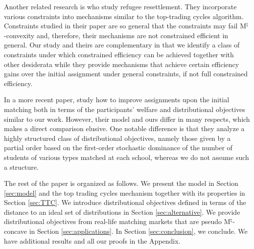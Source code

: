 \documentclass[12pt]{amsart}
\theoremstyle{remark}
\begin{document}
Another related research is \citet{delacretaz2019matching} who study refugee resettlement. They incorporate various constraints into mechanisms similar to the
top-trading cycles algorithm. Constraints studied in their paper are so general that the constraints may fail M$^\natural$-convexity and, therefore, their
mechanisms are not constrained efficient in general. Our study and theirs are complementary in that we identify a class of constraints under
which constrained efficiency can be achieved together with other desiderata while they provide mechanisms that achieve certain efficiency gains over
the initial assignment under general constraints, if not full constrained efficiency.

In a more recent paper, \cite{combe2022market} study how to improve assignments upon the initial matching both in terms of the participants' welfare and distributional objectives similar to our work. However, their model and ours differ in many respects, which makes a direct comparison elusive. One notable difference is that they analyze a highly structured class of distributional objectives, namely those given by a partial order based on the first-order stochastic dominance of the number of students of various types matched at each school, whereas we do not assume such a structure.

\begin{comment}
There are two recent papers with distributional objectives that do not impose individual rationality. First, \cite{imamuraefficient} study Pareto efficient matchings where distributional constraints are represented via a collection of sets that include student-school pairs. When the collection forms a \emph{matroid}, they show that the serial dictatorship algorithm can be used to check Pareto efficiency. Moreover, \cite{imamuraefficient} introduces a constrained version of the serial dictatorship algorithm to check for Pareto efficiency under general constraints. In contrast to our paper, this paper does not deal with incentive concerns. Second, \cite{koji2022} studies an object allocation problem with heterogeneous objects where agent preferences can have indifferences. He assumes that the set of feasible allocations forms a discrete structure called \emph{integral polymatroid} and constructs a mechanism that is efficient, strategy-proof, and polynomial-time computable.
\end{comment}

The rest of the paper is organized as follows. We present the model in Section \ref{sec:model} and the top trading cycles
mechanism together with its properties in Section \ref{sec:TTC}. We introduce distributional objectives defined in terms of
the distance to an ideal set of distributions in Section \ref{sec:alternative}. We provide distributional objectives from
real-life matching markets that are pseudo M$^{\natural}$-concave in Section \ref{sec:applications}. In Section \ref{sec:conclusion}, we conclude.
We have additional results and all our proofs in the Appendix.
\end{document}
